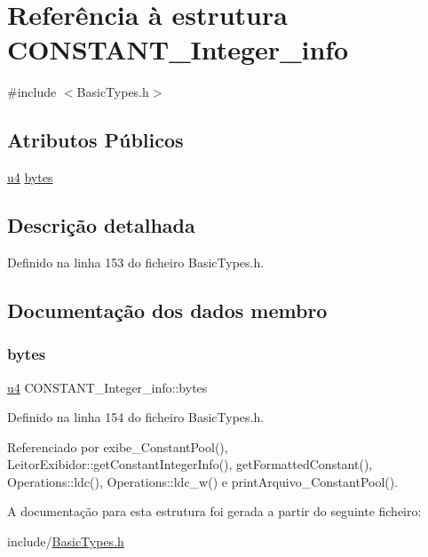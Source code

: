 \hypertarget{structCONSTANT__Integer__info}{}\section{Referência à estrutura C\+O\+N\+S\+T\+A\+N\+T\+\_\+\+Integer\+\_\+info}
\label{structCONSTANT__Integer__info}


{\ttfamily \#include $<$Basic\+Types.\+h$>$}

\subsection*{Atributos Públicos}
\begin{DoxyCompactItemize}
\item 
\hyperlink{BasicTypes_8h_ae5be1f726785414dd1b77d60df074c9d}{u4} \hyperlink{structCONSTANT__Integer__info_a96773e0cf436f4a55e404adf9bcb2c36}{bytes}
\end{DoxyCompactItemize}


\subsection{Descrição detalhada}


Definido na linha 153 do ficheiro Basic\+Types.\+h.



\subsection{Documentação dos dados membro}
\mbox{\label{structCONSTANT__Integer__info_a96773e0cf436f4a55e404adf9bcb2c36}} 
\subsubsection{\texorpdfstring{bytes}{bytes}}
{\footnotesize\ttfamily \hyperlink{BasicTypes_8h_ae5be1f726785414dd1b77d60df074c9d}{u4} C\+O\+N\+S\+T\+A\+N\+T\+\_\+\+Integer\+\_\+info\+::bytes}



Definido na linha 154 do ficheiro Basic\+Types.\+h.



Referenciado por exibe\+\_\+\+Constant\+Pool(), Leitor\+Exibidor\+::get\+Constant\+Integer\+Info(), get\+Formatted\+Constant(), Operations\+::ldc(), Operations\+::ldc\+\_\+w() e print\+Arquivo\+\_\+\+Constant\+Pool().



A documentação para esta estrutura foi gerada a partir do seguinte ficheiro\+:\begin{DoxyCompactItemize}
\item 
include/\hyperlink{BasicTypes_8h}{Basic\+Types.\+h}\end{DoxyCompactItemize}
